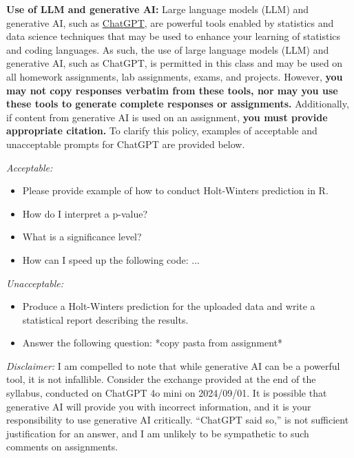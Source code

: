 \documentclass[11pt, a4paper]{article}
\begin{document}
\vspace{4mm}

\noindent \textbf{Use of LLM and generative AI:} Large language models
(LLM) and generative AI, such as
\href{https://openai.com/chatgpt/}{ChatGPT}, are powerful tools enabled
by statistics and data science techniques that may be used to enhance
your learning of statistics and coding languages. As such, the use of
large language models (LLM) and generative AI, such as ChatGPT, is
permitted in this class and may be used on all homework assignments, lab
assignments, exams, and projects. However,
\textbf{you may not copy responses verbatim from these tools, nor may you use these tools to generate complete responses or assignments.}
Additionally, if content from generative AI is used on an assignment,
\textbf{you must provide appropriate citation.} To clarify this policy,
examples of acceptable and unacceptable prompts for ChatGPT are provided
below.

\vspace{4mm}

\noindent \textit{Acceptable:}

\begin{itemize}
\item Please provide example of how to conduct Holt-Winters prediction in R. 
\item How do I interpret a p-value?
\item What is a significance level?
\item How can I speed up the following code: ...
\end{itemize}

\noindent \textit{Unacceptable:}

\begin{itemize}
\item Produce a Holt-Winters prediction for the uploaded data and write a statistical report describing the results. 
\item Answer the following question: *copy pasta from assignment*
\end{itemize}

\noindent \textit{Disclaimer:} I am compelled to note that while
generative AI can be a powerful tool, it is not infallible. Consider the
exchange provided at the end of the syllabus, conducted on ChatGPT 4o
mini on 2024/09/01. It is possible that generative AI will provide you
with incorrect information, and it is your responsibility to use
generative AI critically. ``ChatGPT said so,'' is not sufficient
justification for an answer, and I am unlikely to be sympathetic to such
comments on assignments.
\end{document}
